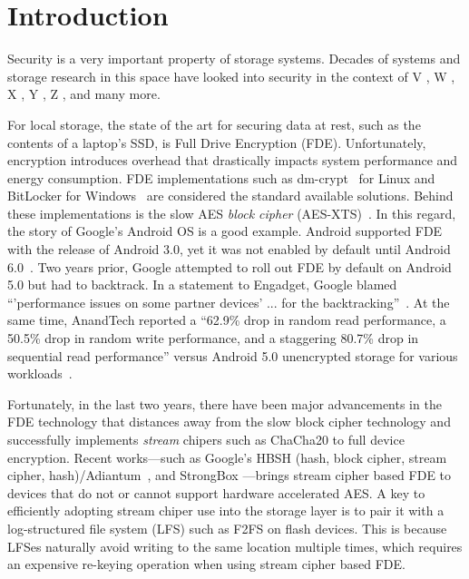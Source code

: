 \section{Introduction} \label{sec:introduction}




Security is a very important property of storage systems. Decades of systems
and storage research in this space have looked into security in the context of V
\cite{v1, v2, v3}, W \cite{w1, w2, w3}, X \cite{x1, x2, x3}, Y \cite{y1, y2,
y3}, Z \cite{z1, z2, z3}, and many more.




For local storage, the state of the art for securing data at rest, such as the
contents of a laptop's SSD, is Full Drive Encryption (FDE). Unfortunately,
encryption introduces overhead that drastically impacts system performance and
energy consumption. FDE implementations such as
dm-crypt~\cite{dmcrypt,DmC-Android} for Linux and BitLocker for
Windows~\cite{bitlocker1,bitlocker2} are considered the standard available
solutions. Behind these implementations is the slow AES \emph{block cipher}
(AES-XTS)~\cite{XTS, XTSComments, NISTXTS}. In this regard, the story of
Google's Android OS is a good example. Android supported FDE with the release of
Android 3.0, yet it was not enabled by default until Android
6.0~\cite{android-M-mobile-motivation}. Two years prior, Google attempted to
roll out FDE by default on Android 5.0 but had to backtrack. In a statement to
Engadget, Google blamed ``'performance issues on some partner devices' ... for
the backtracking''~\cite{google-engadget}. At the same time, AnandTech reported
a ``62.9\% drop in random read performance, a 50.5\% drop in random write
performance, and a staggering 80.7\% drop in sequential read performance''
versus Android 5.0 unencrypted storage for various
workloads~\cite{android-M-mobile-motivation-2}.



Fortunately, in the last two years, there have been major advancements in the
FDE technology that distances away from the slow block cipher technology and
successfully implements {\em stream} chipers such as ChaCha20 to full device
encryption. Recent works---such as Google's HBSH (hash, block cipher, stream
cipher, hash)/Adiantum~\cite{Adiantum}, and StrongBox \cite{StrongBox}---brings
stream cipher based FDE to devices that do not or cannot support hardware
accelerated AES. A key to efficiently adopting stream chiper use into the
storage layer is to pair it with a log-structured file system (LFS) such as F2FS
on flash devices. This is because LFSes naturally avoid writing to the same
location multiple times, which requires an expensive re-keying operation when
using stream cipher based FDE.


